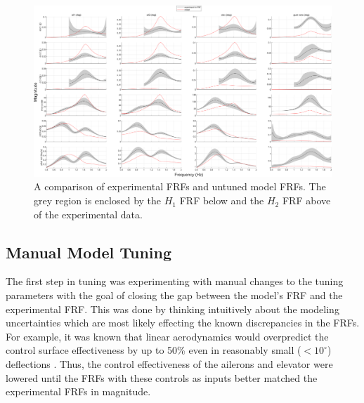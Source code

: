 \begin{landscape}

\begin{figure}[H]
	\centering
	\label{fig:noTuneFRF}
	\includegraphics[width=9in]{figs/FRFcompare_noTune_q207.png}
	\caption{A comparison of experimental FRFs and untuned model FRFs. The grey region is enclosed by the $H_1$ FRF below and the $H_2$ FRF above of the experimental data.}
\end{figure}

\end{landscape}

\subsection{Manual Model Tuning} %

The first step in tuning was experimenting with manual changes to the tuning parameters with the goal of closing the gap between the model's FRF and the experimental FRF. This was done by thinking intuitively about the modeling uncertainties which are most likely effecting the known discrepancies in the FRFs. For example, it was known that linear aerodynamics would overpredict the control surface effectiveness by up to 50\% even in reasonably small ($<10^\circ$) deflections \cite{Young1947,Riebe1955}. Thus, the control effectiveness of the ailerons and elevator were lowered until the FRFs with these controls as inputs better matched the experimental FRFs in magnitude.


